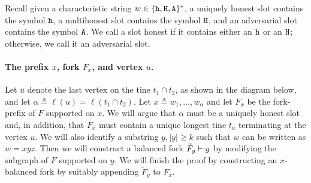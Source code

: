   Recall given a characteristic string $w \in \{\mathtt{h}, \mathtt{H}, \mathtt{A}\}^*$, 
  a uniquely honest slot contains the symbol $\mathtt{h}$, 
  a multihonest slot contains the symbol $\mathtt{H}$, 
  and an adversarial slot contains the symbol $\mathtt{A}$.
  We call a slot honest if it contains either an $\mathtt{h}$ or an $\mathtt{H}$; 
  otherwise, we call it an adversarial slot. 

  \paragraph{The prefix $x$, fork $F_x$, and vertex $u$.} 
  Let $u$ denote the last vertex on the tine
  $t_1 \cap t_2$, as shown in the diagram below, and let
  $\alpha \triangleq \ell(u) = \ell(t_1 \cap t_2)$. 
  Let $x \triangleq w_1, \ldots, w_\alpha$ 
  and let $F_x$ be the fork-prefix of $F$ supported on $x$. 
  We will argue that $\alpha$ must be a uniquely honest slot and, 
  in addition, that 
  $F_x$ must contain a unique longest tine $t_u$ terminating 
  at the vertex $u$. 
  We will also identify a substring 
  $y, |y| \geq k$ 
  such that $w$ can be written as $w = xyz$. 
  Then we will construct a balanced fork $\tilde{F}_y \vdash y$ by 
  modifying the subgraph of $F$ supported on $y$. 
  We will finish the proof by constructing an $x$-balanced fork by 
  suitably appending $\tilde{F}_y$ to $F_x$.
    
  \begin{center}
    \end{center}

